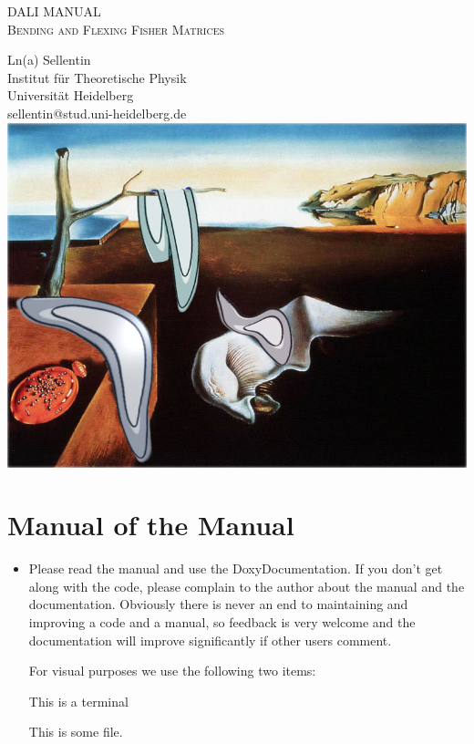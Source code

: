 \documentclass[12pt,twoside]{extarticle}
\newenvironment{exercise}{\begin{eBox}}{\hfill{\color{daliblue}}\end{eBox}}
\newenvironment{file}{\begin{fBox}}{\hfill{\color{dalifile}}\end{fBox}}
\begin{document}
\thispagestyle{empty} %
 
\begin{center}
\begin{LARGE}
\vspace{6cm}
 \textsc{DALI MANUAL\\\vspace{0.5cm}Bending and Flexing Fisher Matrices}
 \vspace{1cm}
\end{LARGE}

Ln(a) Sellentin\\Institut für Theoretische Physik\\Universität Heidelberg\\
sellentin@stud.uni-heidelberg.de\\
\vspace{0.5cm}
 \includegraphics[width=\textwidth]{Dali.png}
\end{center}

\newpage
\thispagestyle{fancy}
 


\vspace{3cm}

\section{Manual of the Manual}
\begin{itemize}
 \item Please read the manual and use the DoxyDocumentation. If you don't get along with the code, please complain to the author about the manual and the documentation. Obviously there is never an end to maintaining and improving a code and a manual, so feedback is very welcome and the documentation will improve significantly if other users comment.

For visual purposes we use the following two items:

 \begin{exercise}
 This is a terminal
 \end{exercise}

\begin{file}
This is some file.
\end{file}
\end{itemize}
\end{document}
